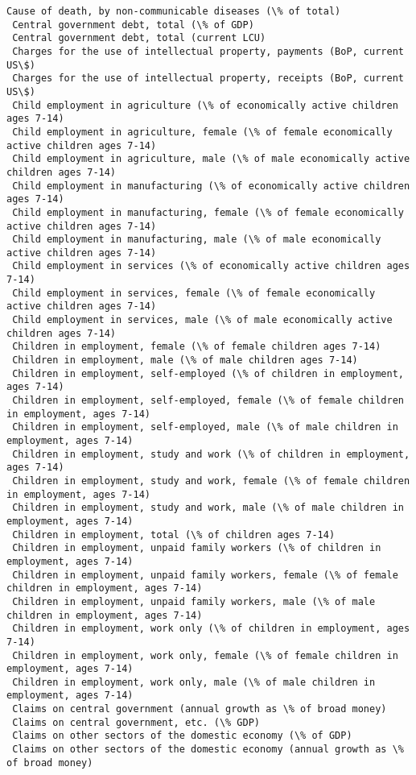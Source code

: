 \documentclass[11pt]{article}
\begin{document}
\begin{Verbatim}[commandchars=\\\{\}]
 Cause of death, by non-communicable diseases (\% of total)
 Central government debt, total (\% of GDP)
 Central government debt, total (current LCU)
 Charges for the use of intellectual property, payments (BoP, current US\$)
 Charges for the use of intellectual property, receipts (BoP, current US\$)
 Child employment in agriculture (\% of economically active children ages 7-14)
 Child employment in agriculture, female (\% of female economically active children ages 7-14)
 Child employment in agriculture, male (\% of male economically active children ages 7-14)
 Child employment in manufacturing (\% of economically active children ages 7-14)
 Child employment in manufacturing, female (\% of female economically active children ages 7-14)
 Child employment in manufacturing, male (\% of male economically active children ages 7-14)
 Child employment in services (\% of economically active children ages 7-14)
 Child employment in services, female (\% of female economically active children ages 7-14)
 Child employment in services, male (\% of male economically active children ages 7-14)
 Children in employment, female (\% of female children ages 7-14)
 Children in employment, male (\% of male children ages 7-14)
 Children in employment, self-employed (\% of children in employment, ages 7-14)
 Children in employment, self-employed, female (\% of female children in employment, ages 7-14)
 Children in employment, self-employed, male (\% of male children in employment, ages 7-14)
 Children in employment, study and work (\% of children in employment, ages 7-14)
 Children in employment, study and work, female (\% of female children in employment, ages 7-14)
 Children in employment, study and work, male (\% of male children in employment, ages 7-14)
 Children in employment, total (\% of children ages 7-14)
 Children in employment, unpaid family workers (\% of children in employment, ages 7-14)
 Children in employment, unpaid family workers, female (\% of female children in employment, ages 7-14)
 Children in employment, unpaid family workers, male (\% of male children in employment, ages 7-14)
 Children in employment, work only (\% of children in employment, ages 7-14)
 Children in employment, work only, female (\% of female children in employment, ages 7-14)
 Children in employment, work only, male (\% of male children in employment, ages 7-14)
 Claims on central government (annual growth as \% of broad money)
 Claims on central government, etc. (\% GDP)
 Claims on other sectors of the domestic economy (\% of GDP)
 Claims on other sectors of the domestic economy (annual growth as \% of broad money)

\end{Verbatim}
\end{document}
